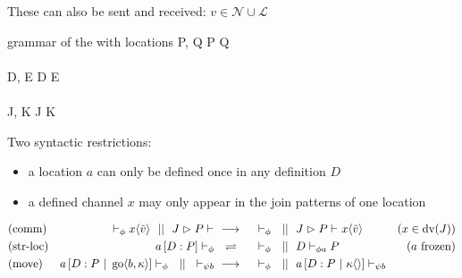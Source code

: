These can also be sent and received:
$ v \in \mathcal{N} \cup \mathcal{L} $


\begin{JDef}{grammar of the \joincalc with locations}
  P, Q
  \grmr {}
  \altn {}
  \altn P \jpar Q
  \altn \jnullproc
  \altn {}
  \\ \\
  D, E
  \grmr {}
  \altn D \jcon E
  \altn \jnulldef
  \altn {}
  \\ \\
  J, K
  \grmr {}
  \altn J \jpat K
\end{JDef}

Two syntactic restrictions:
\begin{itemize}
  \item a location $a$ can only be defined once in any definition $D$
  \item a defined channel $x$ may only appear in the join patterns of one location
\end{itemize}

\begin{align*}
  \chamred{comm}{(x \in \dv{J})}{
    \chamcnf{\phi}{}{\jsnd{x}{\tilde{v}}}
    \champar
    \chamcnf{}{\jrct{J}{P}}{}
  }{
    \chamcnf{\phi}{}{}
    \champar
    \chamcnf{}{\jrct{J}{P}}{\jsnd{x}{\tilde{v}}}
  }
  \\
  \chamequ{str-loc}{(a \ \text{frozen)}}{
    \chamcnf{\phi}{\jloc{a}{D}{P}}{}
  }{
    \chamcnf{\phi}{}{}
    \champar
    \chamcnf{\phi a}{D}{P}
  }
  \\
  \chamred{move}{}{
    \chamcnf{\phi}{\jloc{a}{D}{P \jpar \jgo{b}{\kappa}}}{}
    \champar
    \chamcnf{\psi b}{}{}
  }{
    \chamcnf{\phi}{}{}
    \champar
    \chamcnf{\psi b}{\jloc{a}{D}{P \jpar \jsnd{\kappa}{}}}{}
  }
\end{align*}
